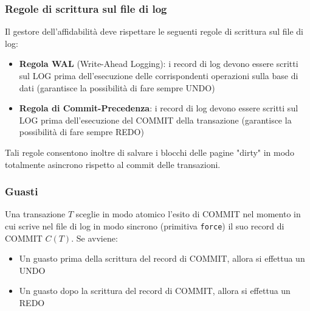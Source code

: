 \documentclass[a4paper,twoside]{article}
\begin{document}
\subsubsection{Regole di scrittura sul file di log}
Il gestore dell'affidabilità deve rispettare le seguenti regole di scrittura sul
file di log:
\begin{itemize}
  \item \textbf{Regola WAL} (Write-Ahead Logging): i record di log devono essere
    scritti sul LOG prima dell'esecuzione delle corrispondenti operazioni sulla base
    di dati (garantisce la possibilità di fare sempre UNDO)

  \item \textbf{Regola di Commit-Precedenza}: i record di log devono essere scritti
    sul LOG prima dell'esecuzione del COMMIT della transazione (garantisce la
    possibilità di fare sempre REDO)
\end{itemize}
Tali regole consentono inoltre di salvare i blocchi delle pagine "dirty" in modo
totalmente asincrono rispetto al commit delle transazioni.

\subsubsection{Guasti}
Una transazione \( T \) sceglie in modo atomico l'esito di COMMIT nel momento in
cui scrive nel file di log in modo sincrono (primitiva \texttt{force}) il suo
record di COMMIT \( C(T) \). Se avviene:
\begin{itemize}
  \item Un guasto prima della scrittura del record di COMMIT, allora si effettua un
    UNDO
  \item Un guasto dopo la scrittura del record di COMMIT, allora si effettua un REDO
\end{itemize}
\end{document}
